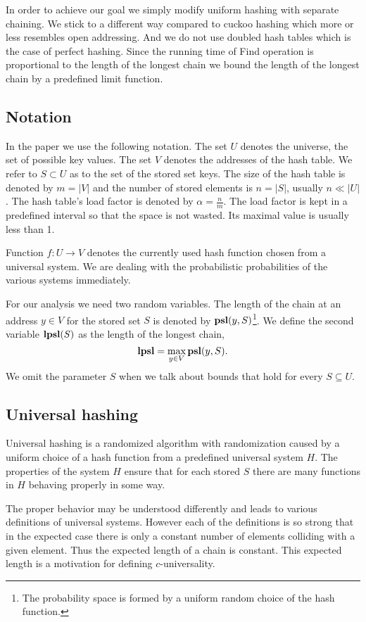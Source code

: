 In order to achieve our goal we simply modify uniform hashing with separate chaining. We stick to a different way compared to cuckoo hashing which more or less resembles open addressing. And we do not use doubled hash tables which is the case of perfect hashing. Since the running time of Find operation is proportional to the length of the longest chain we bound the length of the longest chain by a predefined limit function.

\subsection{Notation}
In the paper we use the following notation. The set $U$ denotes the universe, the set of possible key values. The set $V$ denotes the addresses of the hash table. We refer to $S \subset U$ as to the set of the stored set keys. The size of the hash table is denoted by $m = |V|$ and the number of stored elements is $n = |S|$, usually $n \ll |U|$. The hash table's load factor is denoted by $\alpha = \frac{n}{m}$. The load factor is kept in a predefined interval so that the space is not wasted. Its maximal value is usually less than 1.

Function $f\colon U \rightarrow V$ denotes the currently used hash function chosen from a universal system. We are dealing with the probabilistic probabilities of the various systems immediately.

For our analysis we need two random variables. The length of the chain at an address $y \in V$ for the stored set $S$ is denoted by $\mathbf{psl}(y, S)$\footnote{The probability space is formed by a uniform random choice of the hash function.}. We define the second variable $\mathbf{lpsl}(S)$ as the length of the longest chain, $$\mathbf{lpsl} = \max_{y \in V} \mathbf{psl}(y, S).$$ We omit the parameter $S$ when we talk about bounds that hold for every $S \subseteq U$.

\subsection{Universal hashing}
Universal hashing is a randomized algorithm with randomization caused by a uniform choice of a hash function from a predefined universal system $H$. The properties of the system $H$ ensure that for each stored $S$ there are many functions in $H$ behaving properly in some way.

The proper behavior may be understood differently and leads to various definitions of universal systems. However each of the definitions is so strong that in the expected case there is only a constant number of elements colliding with a given element. Thus the expected length of a chain is constant. This expected length is a motivation for defining $c$-universality.

